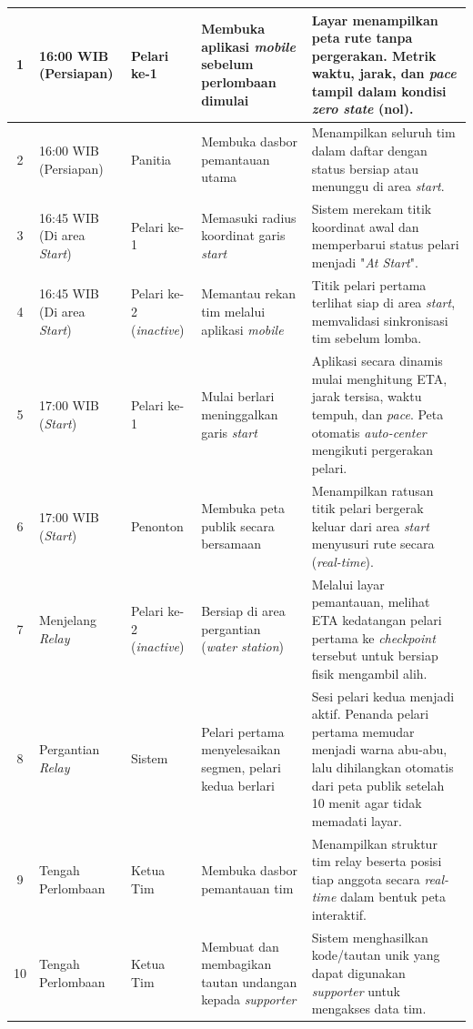 \begin{longtable}{|c|p{2cm}|p{1.5cm}|p{3cm}|p{5cm}|}
1 & 16:00 WIB (Persiapan) & Pelari ke-1 & Membuka aplikasi \textit{mobile} sebelum perlombaan dimulai & Layar menampilkan peta rute tanpa pergerakan. Metrik waktu, jarak, dan \textit{pace} tampil dalam kondisi \textit{zero state} (nol). \\ \hline
2 & 16:00 WIB (Persiapan) & Panitia & Membuka dasbor pemantauan utama & Menampilkan seluruh tim dalam daftar dengan status bersiap atau menunggu di area \textit{start}. \\ \hline
3 & 16:45 WIB (Di area \textit{Start}) & Pelari ke-1 & Memasuki radius koordinat garis \textit{start} & Sistem merekam titik koordinat awal dan memperbarui status pelari menjadi "\textit{At Start}". \\ \hline
4 & 16:45 WIB (Di area \textit{Start}) & Pelari ke-2 (\textit{inactive}) & Memantau rekan tim melalui aplikasi \textit{mobile} & Titik pelari pertama terlihat siap di area \textit{start}, memvalidasi sinkronisasi tim sebelum lomba. \\ \hline
5 & 17:00 WIB (\textit{Start}) & Pelari ke-1 & Mulai berlari meninggalkan garis \textit{start} & Aplikasi secara dinamis mulai menghitung ETA, jarak tersisa, waktu tempuh, dan \textit{pace}. Peta otomatis \textit{auto-center} mengikuti pergerakan pelari. \\ \hline
6 & 17:00 WIB (\textit{Start}) & Penonton & Membuka peta publik secara bersamaan & Menampilkan ratusan titik pelari bergerak keluar dari area \textit{start} menyusuri rute secara (\textit{real-time}). \\ \hline
7 & Menjelang \textit{Relay} & Pelari ke-2 (\textit{inactive}) & Bersiap di area pergantian (\textit{water station}) & Melalui layar pemantauan, melihat ETA kedatangan pelari pertama ke \textit{checkpoint} tersebut untuk bersiap fisik mengambil alih. \\ \hline
8 & Pergantian \textit{Relay} & Sistem & Pelari pertama menyelesaikan segmen, pelari kedua berlari & Sesi pelari kedua menjadi aktif. Penanda pelari pertama memudar menjadi warna abu-abu, lalu dihilangkan otomatis dari peta publik setelah 10 menit agar tidak memadati layar. \\ \hline
9 & Tengah Perlombaan & Ketua Tim & Membuka dasbor pemantauan tim & Menampilkan struktur tim relay beserta posisi tiap anggota secara \textit{real-time} dalam bentuk peta interaktif. \\ \hline
10 & Tengah Perlombaan & Ketua Tim & Membuat dan membagikan tautan undangan kepada \textit{supporter} & Sistem menghasilkan kode/tautan unik yang dapat digunakan \textit{supporter} untuk mengakses data tim. \\ \hline

\end{longtable}
